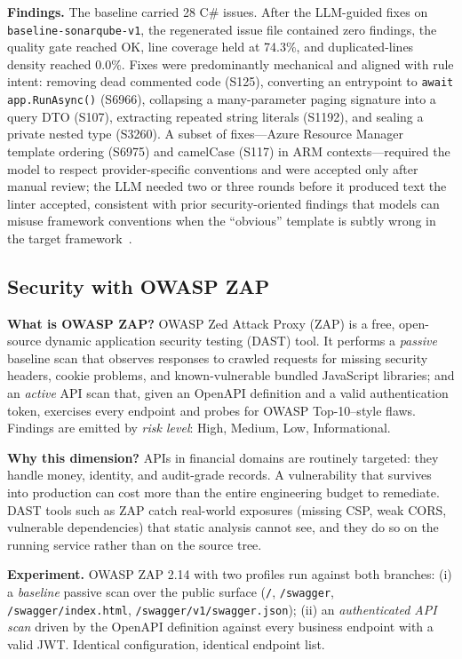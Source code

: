 \documentclass[conference]{IEEEtran}
\begin{document}
\textbf{Findings.} The baseline carried 28 C\# issues. After the LLM-guided fixes on \texttt{baseline-sonarqube-v1}, the regenerated issue file contained zero findings, the quality gate reached \textsc{OK}, line coverage held at 74.3\%, and duplicated-lines density reached 0.0\%. Fixes were predominantly mechanical and aligned with rule intent: removing dead commented code (\textsc{S125}), converting an entrypoint to \texttt{await app.RunAsync()} (\textsc{S6966}), collapsing a many-parameter paging signature into a query DTO (\textsc{S107}), extracting repeated string literals (\textsc{S1192}), and sealing a private nested type (\textsc{S3260}). A subset of fixes---Azure Resource Manager template ordering (\textsc{S6975}) and camelCase (\textsc{S117}) in ARM contexts---required the model to respect provider-specific conventions and were accepted only after manual review; the LLM needed two or three rounds before it produced text the linter accepted, consistent with prior security-oriented findings that models can misuse framework conventions when the ``obvious'' template is subtly wrong in the target framework~\cite{ref6,ref11,ref12}.

\subsection{Security with OWASP ZAP}\label{sec:zap}
\textbf{What is OWASP ZAP?} OWASP Zed Attack Proxy (ZAP) is a free, open-source dynamic application security testing (DAST) tool. It performs a \emph{passive} baseline scan that observes responses to crawled requests for missing security headers, cookie problems, and known-vulnerable bundled JavaScript libraries; and an \emph{active} API scan that, given an OpenAPI definition and a valid authentication token, exercises every endpoint and probes for OWASP Top-10--style flaws. Findings are emitted by \emph{risk level}: High, Medium, Low, Informational.

\textbf{Why this dimension?} APIs in financial domains are routinely targeted: they handle money, identity, and audit-grade records. A vulnerability that survives into production can cost more than the entire engineering budget to remediate. DAST tools such as ZAP catch real-world exposures (missing CSP, weak CORS, vulnerable dependencies) that static analysis cannot see, and they do so on the running service rather than on the source tree.

\textbf{Experiment.} OWASP ZAP 2.14 with two profiles run against both branches: (i) a \emph{baseline} passive scan over the public surface (\texttt{/}, \texttt{/swagger}, \texttt{/swagger/index.html}, \texttt{/swagger/v1/swagger.json}); (ii) an \emph{authenticated API scan} driven by the OpenAPI definition against every business endpoint with a valid JWT. Identical configuration, identical endpoint list.
\end{document}
